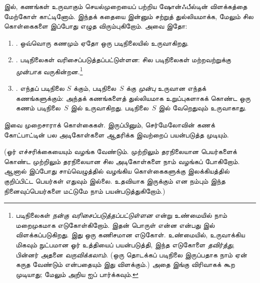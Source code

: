 \documentclass[../../../include/open-logic-section]{subfiles}
\begin{document}

 இல், கணங்கள் உருவாகும் செயல்முறையைப் பற்றிய
ஷோன்ஃபீல்டின் விளக்கத்தை மேற்கோள் காட்டினோம். இந்தக் கதையை இன்னும் சற்றுத்
துல்லியமாக்க, மேலும் சில கொள்கைகளை இப்போது எழுத விரும்புகிறோம். அவை இதோ:
\begin{enumerate}
\item[] \stageshier. ஒவ்வொரு கணமும் ஏதோ ஒரு படிநிலையில் உருவாகிறது.
\item[] \stagesord. படிநிலைகள் வரிசைப்படுத்தப்பட்டுள்ளன: சில படிநிலைகள்
மற்றவற்றுக்கு \emph{முன்பாக} வருகின்றன.\footnote{படிநிலைகள்
\emph{நன்கு வரிசைப்படுத்தப்பட்டுள்ளன} என்று உண்மையில் நாம் மறைமுகமாக
எடுகோள்கிறோம். இதன் பொருள் என்ன என்பது  இல்
விளக்கப்படுகிறது. இது ஒரு கணிசமான எடுகோள். உண்மையில்,
\citet{Scott1974} உருவாக்கிய மிகவும் நுட்பமான ஓர் உத்தியைப் பயன்படுத்தி,
இந்த எடுகோளை \emph{தவிர்த்து}, பின்னர் அதனை \emph{வருவிக்கலாம்}. (ஒரு
தொடக்கப் படிநிலை இருப்பதாக நாம் ஏன் கருத வேண்டும் என்பதையும் இது
விளக்கும்.) அதை இங்கு விரிவாகக் கூற முடியாது; மேலும் அறிய
\citet{ButtonLT1} ஐப் பார்க்கவும்.}
\item[] \stagesacc. எந்தப் படிநிலை $S$ க்கும், படிநிலை~$S$ க்கு
\emph{முன்பு} உருவான எந்தக் கணங்களுக்கும்: அந்தக் கணங்களைத் துல்லியமாக
உறுப்புகளாகக் கொண்ட ஒரு கணம் படிநிலை~$S$ இல் உருவாகிறது. படிநிலை~$S$
இல் வேறெதுவும் உருவாகாது.
\end{enumerate}
இவை முறைசாராக் கொள்கைகள். இருப்பினும், செர்மேலோவின் கணக் கோட்பாட்டின்
பல அடிகோள்களை ஆதரிக்க இவற்றைப் பயன்படுத்த முடியும்.

(ஓர் எச்சரிக்கையையும் வழங்க வேண்டும். முற்றிலும் தரநிலையான பெயர்களைக்
கொண்ட முற்றிலும் தரநிலையான சில அடிகோள்களை நாம் வழங்கப் போகிறோம்.
ஆனால் இப்போது சாய்வெழுத்தில் வழங்கிய கொள்கைகளுக்கு இலக்கியத்தில்
குறிப்பிட்ட பெயர்கள் எதுவும் இல்லை. உதவியாக இருக்கும் என நம்பும் இந்த
நினைவுப்பெயர்களை மட்டுமே நாம் பயன்படுத்துகிறோம்.)
\end{document}
